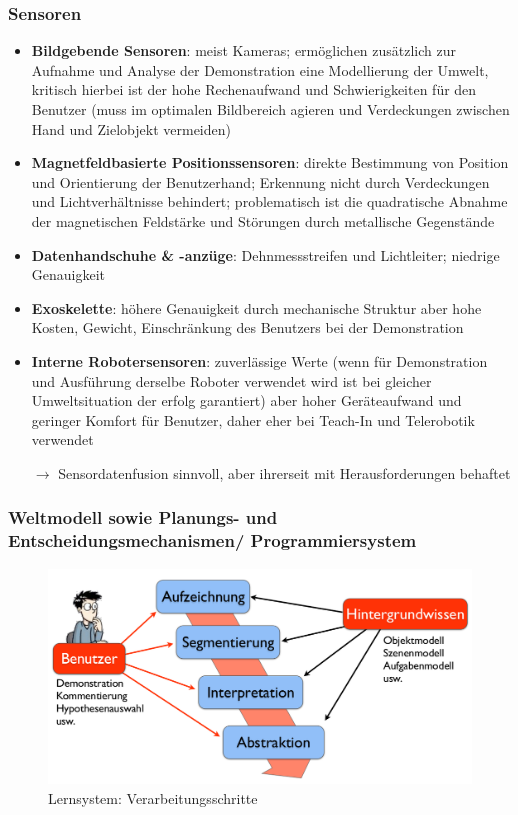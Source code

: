 \subsubsection*{Sensoren}
\begin{itemize}
\item \textbf{Bildgebende Sensoren}: meist Kameras; ermöglichen zusätzlich zur Aufnahme und Analyse der Demonstration eine Modellierung der Umwelt, kritisch hierbei ist der hohe Rechenaufwand und Schwierigkeiten für den Benutzer (muss im optimalen Bildbereich agieren und Verdeckungen zwischen Hand und Zielobjekt vermeiden)
\item \textbf{Magnetfeldbasierte Positionssensoren}: direkte Bestimmung von Position und Orientierung der Benutzerhand; Erkennung nicht durch Verdeckungen und Lichtverhältnisse behindert; problematisch ist die quadratische Abnahme der magnetischen Feldstärke und Störungen durch metallische Gegenstände
\item \textbf{Datenhandschuhe \& -anzüge}: Dehnmessstreifen und Lichtleiter; niedrige Genauigkeit 
\item \textbf{Exoskelette}: höhere Genauigkeit durch mechanische Struktur aber hohe Kosten, Gewicht, Einschränkung des Benutzers bei der Demonstration  
\item \textbf{Interne Robotersensoren}: zuverlässige Werte (wenn für Demonstration und Ausführung derselbe Roboter verwendet wird ist bei gleicher Umweltsituation der erfolg garantiert) aber hoher Geräteaufwand und geringer Komfort für Benutzer, daher eher bei Teach-In und Telerobotik verwendet
\item[$\rightarrow$] Sensordatenfusion sinnvoll, aber ihrerseit mit Herausforderungen behaftet
\end{itemize}
\subsubsection*{Weltmodell sowie Planungs- und Entscheidungsmechanismen/ Programmiersystem}
\begin{figure}[ht]\centering 
\includegraphics[width=0.6\linewidth]{figures/ch03_verarbeitungsschritte.png}
\caption{Lernsystem: Verarbeitungsschritte}
\label{fig:ch03_verarb}
\end{figure}

